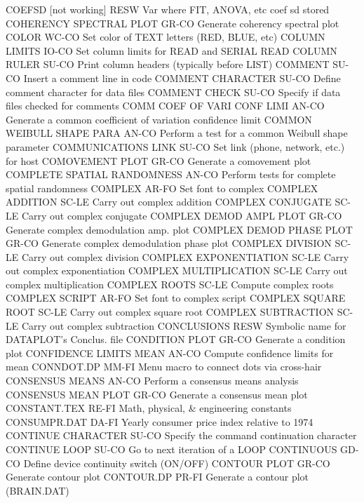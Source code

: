 COEFSD [not working]        RESW  Var where FIT, ANOVA, etc coef sd stored
COHERENCY SPECTRAL PLOT     GR-CO Generate coherency spectral plot
COLOR                       WC-CO Set color of TEXT letters (RED, BLUE, etc)
COLUMN LIMITS               IO-CO Set column limits for READ and SERIAL READ
COLUMN RULER                SU-CO Print column headers (typically before LIST)
COMMENT                     SU-CO Insert a comment line in code
COMMENT CHARACTER           SU-CO Define comment character for data files
COMMENT CHECK               SU-CO Specify if data files checked for comments
COMM COEF OF VARI CONF LIMI AN-CO Generate a common coefficient of variation confidence limit
COMMON WEIBULL SHAPE PARA   AN-CO Perform a test for a common Weibull shape parameter
COMMUNICATIONS LINK         SU-CO Set link (phone, network, etc.) for host
COMOVEMENT PLOT             GR-CO Generate a comovement plot
COMPLETE SPATIAL RANDOMNESS AN-CO Perform tests for complete spatial randomness
COMPLEX                     AR-FO Set font to complex
COMPLEX ADDITION            SC-LE Carry out complex addition
COMPLEX CONJUGATE           SC-LE Carry out complex conjugate
COMPLEX DEMOD AMPL PLOT     GR-CO Generate complex demodulation amp. plot
COMPLEX DEMOD PHASE PLOT    GR-CO Generate complex demodulation phase plot
COMPLEX DIVISION            SC-LE Carry out complex division
COMPLEX EXPONENTIATION      SC-LE Carry out complex exponentiation
COMPLEX MULTIPLICATION      SC-LE Carry out complex multiplication
COMPLEX ROOTS               SC-LE Compute complex roots
COMPLEX SCRIPT              AR-FO Set font to complex script
COMPLEX SQUARE ROOT         SC-LE Carry out complex square root
COMPLEX SUBTRACTION         SC-LE Carry out complex subtraction
CONCLUSIONS                 RESW  Symbolic name for DATAPLOT's Conclus. file
CONDITION PLOT              GR-CO Generate a condition plot
CONFIDENCE LIMITS MEAN      AN-CO Compute confidence limits for mean
CONNDOT.DP                  MM-FI Menu macro to connect dots via cross-hair
CONSENSUS MEANS             AN-CO Perform a consensus means analysis
CONSENSUS MEAN PLOT         GR-CO Generate a consensus mean plot
CONSTANT.TEX                RE-FI Math, physical, & engineering constants
CONSUMPR.DAT                DA-FI Yearly consumer price index relative to 1974
CONTINUE CHARACTER          SU-CO Specify the command continuation character
CONTINUE LOOP               SU-CO Go to next iteration of a LOOP
CONTINUOUS                  GD-CO Define device continuity switch (ON/OFF)
CONTOUR PLOT                GR-CO Generate contour plot
CONTOUR.DP                  PR-FI Generate a contour plot (BRAIN.DAT)
